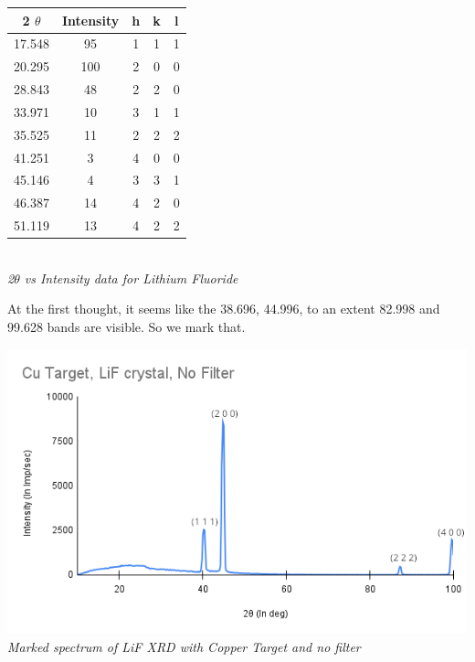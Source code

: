 \documentclass[]{report}[12 pt]
\begin{document}
\begin{center}
	\begin{tabular}{|c|c|c|c|c|}
		\hline
		2 $\theta$ & Intensity & h & k & l \\
		\hline
		17.548 & 95 & 1 & 1 & 1 \\
		\hline
		20.295 & 100 & 2 & 0 & 0 \\
		\hline
		28.843 & 48 & 2 & 2 & 0 \\
		\hline
		33.971 & 10 & 3 & 1 & 1 \\
		\hline
		35.525 & 11 & 2 & 2 & 2 \\
		\hline
		41.251 & 3 & 4 & 0 & 0 \\
		\hline
		45.146 & 4 & 3 & 3 & 1 \\
		\hline
		46.387 & 14 & 4 & 2 & 0 \\
		\hline
		51.119 & 13 & 4 & 2 & 2 \\
		\hline
	\end{tabular}\\
	\textit{2$\theta$ vs Intensity data for Lithium Fluoride}
\end{center}
At the first thought, it seems like the 38.696, 44.996, to an extent 82.998 and 99.628 bands are visible. So we mark that.
\begin{center}
	\includegraphics[width=10 cm]{a1.png}\\
	\textit{Marked spectrum of LiF XRD with Copper Target and no filter}
\end{center}
\end{document}

